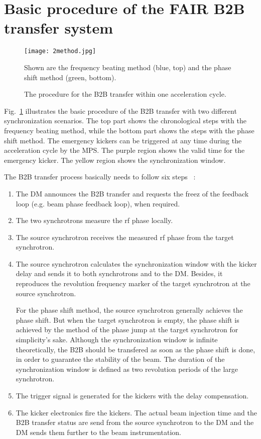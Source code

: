 \section{Basic procedure of the FAIR B2B transfer system}
\begin{figure}[H]
   \centering   
   \texttt{[image: 2method.jpg]}
   \caption{The procedure for the B2B transfer within one acceleration cycle.}{Shown are the frequency beating method (blue, top) and the phase shift method (green, bottom).}
   \label{2method}
\end{figure}
Fig.~\ref{2method} illustrates the basic procedure of the B2B transfer with two different synchronization scenarios. The top part shows the chronological steps with the frequency beating method, while the bottom part shows the steps with the phase shift method. The emergency kickers can be triggered at any time during the acceleration cycle by the MPS. The purple region shows the valid time for the emergency kicker. The yellow region shows the synchronization window. 


The B2B transfer process basically needs to follow six steps ~\cite{bai_bunch_2015}:
\begin{enumerate}
\item The DM announces the B2B transfer and requests the freez of the feedback loop (e.g. beam phase feedback loop), when required.
\item The two synchrotrons measure the rf phase locally.
\item The source synchrotron receives the measured rf phase from the target synchrotron.
\item The source synchrotron calculates the synchronization window with the kicker delay and sends it to both synchrotrons and to the DM. Besides, it reproduces the revolution frequency marker of the target synchrotron at the source synchrotron.

For the phase shift method, the source synchrotron generally achieves the phase shift. But when the target synchrotron is empty, the phase shift is achieved by the method of the phase jump at the target synchrotron for simplicity's sake. Although the synchronization window is infinite theoretically, the B2B should be transfered as soon as the phase shift is done, in order to guarantee the stability of the beam. The duration of the synchronization window is defined as two revolution periods of the large synchrotron. 
\item The trigger signal is generated for the kickers with the delay compensation.
\item The kicker electronics fire the kickers. The actual beam injection time and the B2B transfer status are send from the source synchrotron to the DM and the DM sends them further to the beam instrumentation.

\end{enumerate}



